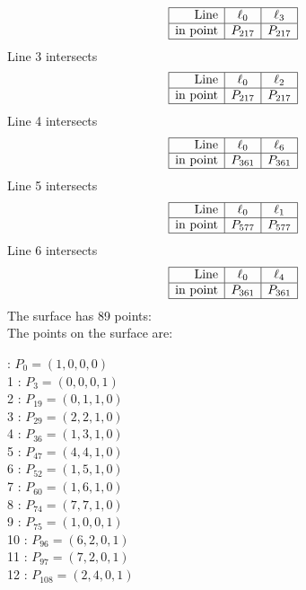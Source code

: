 \documentclass{article}
\begin{document}
{$$\begin{array}{|r*{2}{|c}|}
\hline
\mbox{Line}  & \ell_{0} & \ell_{3}\\
\hline
\mbox{in point}  & P_{217} & P_{217}\\
\hline
\end{array}
$$
Line 3 intersects 
$$
\begin{array}{|r*{2}{|c}|}
\hline
\mbox{Line}  & \ell_{0} & \ell_{2}\\
\hline
\mbox{in point}  & P_{217} & P_{217}\\
\hline
\end{array}
$$
Line 4 intersects 
$$
\begin{array}{|r*{2}{|c}|}
\hline
\mbox{Line}  & \ell_{0} & \ell_{6}\\
\hline
\mbox{in point}  & P_{361} & P_{361}\\
\hline
\end{array}
$$
Line 5 intersects 
$$
\begin{array}{|r*{2}{|c}|}
\hline
\mbox{Line}  & \ell_{0} & \ell_{1}\\
\hline
\mbox{in point}  & P_{577} & P_{577}\\
\hline
\end{array}
$$
Line 6 intersects 
$$
\begin{array}{|r*{2}{|c}|}
\hline
\mbox{Line}  & \ell_{0} & \ell_{4}\\
\hline
\mbox{in point}  & P_{361} & P_{361}\\
\hline
\end{array}
$$
The surface has 89 points:\\
The points on the surface are:\\
\begin{multicols}{3}
 : $P_{0}=( 1, 0, 0, 0 )$\\
1 : $P_{3}=( 0, 0, 0, 1 )$\\
2 : $P_{19}=( 0, 1, 1, 0 )$\\
3 : $P_{29}=( 2, 2, 1, 0 )$\\
4 : $P_{36}=( 1, 3, 1, 0 )$\\
5 : $P_{47}=( 4, 4, 1, 0 )$\\
6 : $P_{52}=( 1, 5, 1, 0 )$\\
7 : $P_{60}=( 1, 6, 1, 0 )$\\
8 : $P_{74}=( 7, 7, 1, 0 )$\\
9 : $P_{75}=( 1, 0, 0, 1 )$\\
10 : $P_{96}=( 6, 2, 0, 1 )$\\
11 : $P_{97}=( 7, 2, 0, 1 )$\\
12 : $P_{108}=( 2, 4, 0, 1 )$\\

\end{multicols}}
\end{document}

